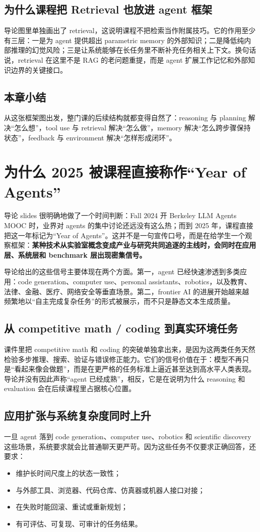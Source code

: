 \documentclass[a4paper]{article}
\begin{document}
\subsection{为什么课程把 Retrieval 也放进 agent 框架}
导论图里单独画出了 retrieval，这说明课程不把检索当作附属技巧。它的作用至少有三层：一是为 agent 提供超出 parametric memory 的外部知识；二是降低纯内部推理的幻觉风险；三是让系统能够在长任务里不断补充任务相关上下文。换句话说，retrieval 在这里不是 RAG 的老问题重提，而是 agent 扩展工作记忆和外部知识边界的关键接口。

\subsection{本章小结}
从这张框架图出发，整门课的后续结构就都变得自然了：reasoning 与 planning 解决“怎么想”，tool use 与 retrieval 解决“怎么做”，memory 解决“怎么跨步骤保持状态”，feedback 与 environment 解决“怎样形成闭环”。

\section{为什么 2025 被课程直接称作“Year of Agents”}
导论 slides 很明确地做了一个时间判断：Fall 2024 开 Berkeley LLM Agents MOOC 时，业界对 agents 的集中讨论还远没有这么热；而到 2025 年，课程直接把这一年标记为“Year of Agents”。这并不是一句宣传口号，而是在给学生一个观察框架：\textbf{某种技术从实验室概念变成产业与研究共同追逐的主线时，会同时在应用层、系统层和 benchmark 层出现密集信号。}

导论给出的这些信号主要体现在两个方面。第一，agent 已经快速渗透到多类应用：code generation、computer use、personal assistants、robotics，以及教育、法律、金融、医疗、网络安全等垂直场景。第二，frontier AI 的进展开始越来越频繁地以“自主完成复杂任务”的形式被展示，而不只是静态文本生成质量。

\subsection{从 competitive math / coding 到真实环境任务}
课件里把 competitive math 和 coding 的突破单独拿出来，是因为这两类任务天然检验多步推理、搜索、验证与错误修正能力。它们的信号价值在于：模型不再只是“看起来像会做题”，而是在更严格的任务标准上逼近甚至达到高水平人类表现。导论并没有因此声称“agent 已经成熟”，相反，它是在说明为什么 reasoning 和 evaluation 会在后续课程里占据核心位置。

\subsection{应用扩张与系统复杂度同时上升}
一旦 agent 落到 code generation、computer use、robotics 和 scientific discovery 这些场景，系统要求就会比普通聊天更严苛。因为这些任务不仅要求正确回答，还要求：
\begin{itemize}
\item 维护长时间尺度上的状态一致性；
\item 与外部工具、浏览器、代码仓库、仿真器或机器人接口对接；
\item 在失败时能回滚、重试或重新规划；
\item 有可评估、可复现、可审计的任务结果。
\end{itemize}
\end{document}
